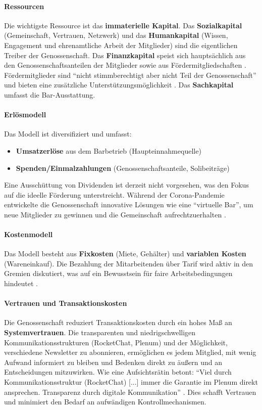 \paragraph{Ressourcen}
Die wichtigste Ressource ist das \textbf{immaterielle Kapital}. Das \textbf{Sozialkapital} (Gemeinschaft, Vertrauen, Netzwerk) und das \textbf{Humankapital} (Wissen, Engagement und ehrenamtliche Arbeit der Mitglieder) sind die eigentlichen Treiber der Genossenschaft. Das \textbf{Finanzkapital} speist sich hauptsächlich aus den Genossenschaftsanteilen der Mitglieder sowie aus Fördermitgliedschaften \parencite{SatzungTRINKGENOSSE2019}. Fördermitglieder sind \enquote{nicht stimmberechtigt aber nicht Teil der Genossenschaft} und bieten eine zusätzliche Unterstützungsmöglichkeit \parencite{mederInterviewZurGeschaftsmodellanalyse2025}. Das \textbf{Sachkapital} umfasst die Bar-Ausstattung.

\paragraph{Erlösmodell}
Das Modell ist diversifiziert und umfasst:
\begin{itemize}
\item \textbf{Umsatzerlöse} aus dem Barbetrieb (Haupteinnahmequelle)
\item \textbf{Spenden/Einmalzahlungen} (Genossenschaftsanteile, Solibeiträge)
\end{itemize}

Eine Ausschüttung von Dividenden ist derzeit nicht vorgesehen, was den Fokus auf die ideelle Förderung unterstreicht. Während der Corona-Pandemie entwickelte die Genossenschaft innovative Lösungen wie eine \enquote{virtuelle Bar}, um neue Mitglieder zu gewinnen und die Gemeinschaft aufrechtzuerhalten \parencite{mederInterviewZurGeschaftsmodellanalyse2025}.

\paragraph{Kostenmodell}
Das Modell besteht aus \textbf{Fixkosten} (Miete, Gehälter) und \textbf{variablen Kosten} (Wareneinkauf). Die Bezahlung der Mitarbeitenden über Tarif wird aktiv in den Gremien diskutiert, was auf ein Bewusstsein für faire Arbeitsbedingungen hindeutet \parencite{mederInterviewZurGeschaftsmodellanalyse2025}.

\paragraph{Vertrauen und Transaktionskosten}
Die Genossenschaft reduziert Transaktionskosten durch ein hohes Maß an \textbf{Systemvertrauen}. Die transparenten und niedrigschwelligen Kommunikationsstrukturen (RocketChat, Plenum) und der Möglichkeit, verschiedene Newsletter zu abonnieren, ermöglichen es jedem Mitglied, mit wenig Aufwand informiert zu bleiben und Bedenken direkt zu äußern und an Entscheidungen mitzuwirken. Wie eine Aufsichtsrätin betont: \enquote{Viel durch Kommunikationsstruktur (RocketChat) [...] immer die Garantie im Plenum direkt ansprechen. Transparenz durch digitale Kommunikation} \parencite{mederInterviewZurGeschaftsmodellanalyse2025}. Dies schafft Vertrauen und minimiert den Bedarf an aufwändigen Kontrollmechanismen.
